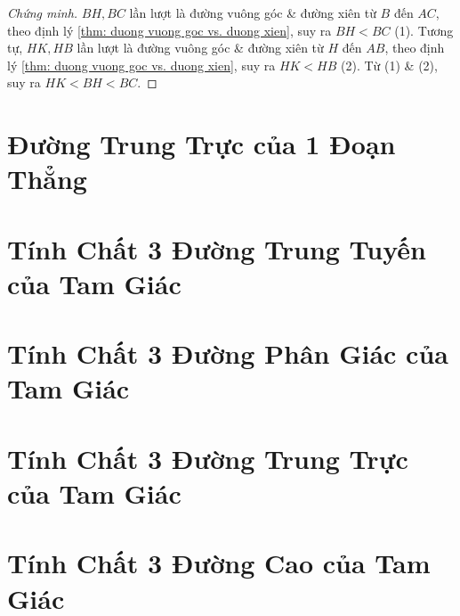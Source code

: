 \documentclass{article}
\begin{document}
\begin{proof}[Chứng minh]
	$BH,BC$ lần lượt là đường vuông góc \& đường xiên từ $B$ đến $AC$, theo định lý \ref{thm: duong vuong goc vs. duong xien}, suy ra $BH < BC$ (1). Tương tự, $HK,HB$ lần lượt là đường vuông góc \& đường xiên từ $H$ đến $AB$, theo định lý \ref{thm: duong vuong goc vs. duong xien}, suy ra $HK < HB$ (2). Từ (1) \& (2), suy ra $HK < BH < BC$.
\end{proof}


\section{Đường Trung Trực của 1 Đoạn Thẳng}


\section{Tính Chất 3 Đường Trung Tuyến của Tam Giác}


\section{Tính Chất 3 Đường Phân Giác của Tam Giác}


\section{Tính Chất 3 Đường Trung Trực của Tam Giác}


\section{Tính Chất 3 Đường Cao của Tam Giác}


\printbibliography[heading=bibintoc]
	
\end{document}
